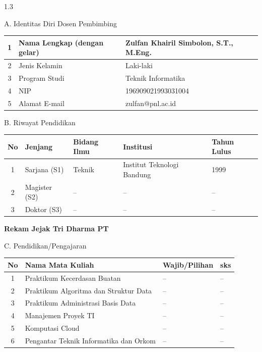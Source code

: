 \documentclass[12pt, a4paper, onecolumn, oneside]{report}
\begin{document}
\begin{spacing}{1.3}
\setlength{\parindent}{0pt}

\noindent A. Identitas Diri Dosen Pembimbing

\vspace{0.1cm}
\begin{tabularx}{\textwidth}{|c|>{\raggedright\arraybackslash}p{5.5cm}|X|}
\hline
1 & Nama Lengkap (dengan gelar) & Zulfan Khairil Simbolon, S.T., M.Eng. \\
\hline
2 & Jenis Kelamin & Laki-laki \\
\hline
3 & Program Studi & Teknik Informatika \\
\hline
4 & NIP & 196909021993031004 \\
\hline
5 & Alamat E-mail & zulfan@pnl.ac.id \\
\hline
\end{tabularx}

\vspace{0.2cm}
\noindent B. Riwayat Pendidikan

\vspace{0.1cm}
\begin{tabularx}{\textwidth}{|c|>{\raggedright\arraybackslash}p{2.6cm}|>{\raggedright\arraybackslash}p{2.4cm}|>{\raggedright\arraybackslash}p{4.5cm}|X|}
\hline
\rowcolor{lightgray}No & Jenjang & Bidang Ilmu & Institusi & Tahun Lulus \\
\hline
1 & Sarjana (S1) & Teknik & Institut Teknologi Bandung & 1999 \\
\hline
2 & Magister (S2) & -- & -- & -- \\
\hline
3 & Doktor (S3) & -- & -- & -- \\
\hline
\end{tabularx}

\vspace{0.2cm}
\noindent \textbf{Rekam Jejak Tri Dharma PT}

\vspace{0.15cm}
\noindent C. Pendidikan/Pengajaran

\vspace{0.1cm}
\begin{tabularx}{\textwidth}{|c|X|>{\raggedright\arraybackslash}p{3cm}|>{\raggedright\arraybackslash}p{1.5cm}|}
\hline
\rowcolor{lightgray}No & Nama Mata Kuliah & Wajib/Pilihan & sks \\
\hline
1 & Praktikum Kecerdasan Buatan & -- & -- \\
\hline
2 & Praktikum Algoritma dan Struktur Data & -- & -- \\
\hline
3 & Praktikum Administrasi Basis Data & -- & -- \\
\hline
4 & Manajemen Proyek TI & -- & -- \\
\hline
5 & Komputasi Cloud & -- & -- \\
\hline
6 & Pengantar Teknik Informatika dan Orkom & -- & -- \\
\hline
\end{tabularx}


\end{spacing}
\end{document}
